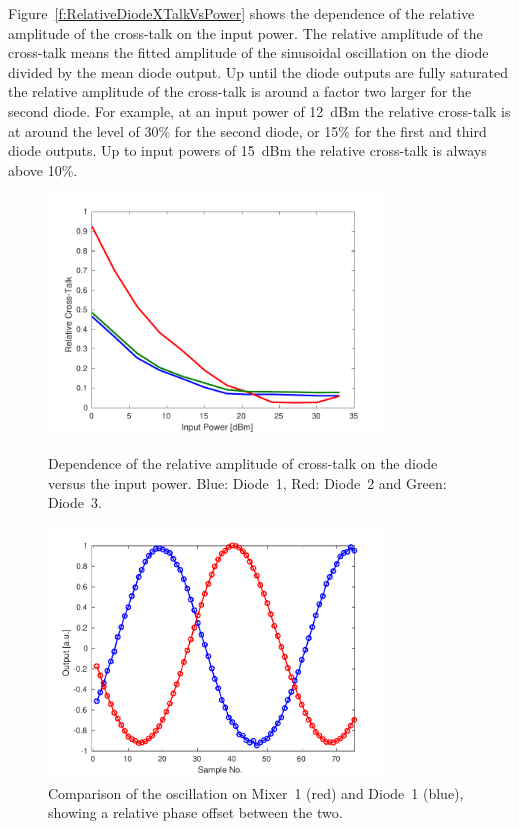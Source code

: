 Figure~\ref{f:RelativeDiodeXTalkVsPower} shows the dependence of the relative amplitude of the cross-talk on the input power. The relative amplitude of the cross-talk means the fitted amplitude of the sinusoidal oscillation on the diode divided by the mean diode output. Up until the diode outputs are fully saturated the relative amplitude of the cross-talk is around a factor two larger for the second diode. For example, at an input power of 12~dBm the relative cross-talk is at around the level of 30\% for the second diode, or 15\% for the first and third diode outputs. Up to input powers of 15~dBm the relative cross-talk is always above 10\%.

\begin{figure}
  \centering
  \includegraphics[width=0.8\textwidth]{Figures/phaseMons/RelativeDiodeXTalkVsPower}
  \caption{Dependence of the relative amplitude of cross-talk on the diode versus the input power. Blue: Diode~1, Red: Diode~2 and Green: Diode~3.}
  \label{f:RelativeDiodeXTalkVsPower}
  \includegraphics[width=0.8\textwidth]{Figures/phaseMons/PhaseDiodeVsMixer}
  \caption{Comparison of the oscillation on Mixer~1 (red) and Diode~1 (blue), showing a relative phase offset between the two.}
  \label{f:PhaseDiodeVsMixer}
\end{figure}

